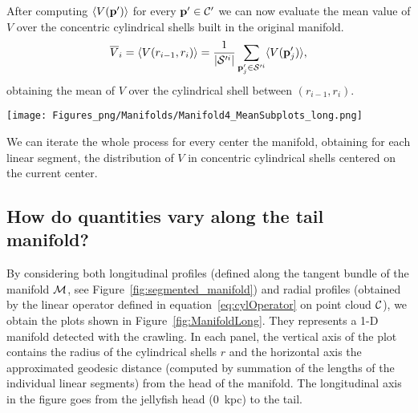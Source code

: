 After computing $\langle V(\boldsymbol{\mathbf{p}}')\rangle$ for every $\boldsymbol{\mathbf{p}}' \in \mathcal{C}'$ we can now evaluate the mean value of $V$ over the concentric cylindrical shells built in the original manifold.%
\begin{equation}
  \overline{V}_{i} = \langle V(r_{i-1},r_i)\rangle = \frac{1}{|\mathcal{S}'^i|} \sum_{\boldsymbol{\mathbf{p}}'_j \in \mathcal{S}'^i} \langle V(\boldsymbol{\mathbf{p}}'_j)\rangle,
\end{equation}
obtaining the mean of $V$ over the cylindrical shell between $(r_{i-1},r_i)$.

\begin{sidewaysfigure}
  \centering
  \texttt{[image: Figures\_png/Manifolds/Manifold4\_MeanSubplots\_long.png]}
  \caption{Longitudinal and radial profiles of different quantities for a long manifold constituting a tentacle of the tail of the jellyfish.
  In the top left corner, the position of the manifold in the diffused dataset is shown in red.
  In the top right corner a detailed view of the non diffused gaseous particle belonging to the manifold.}
  \label{fig:ManifoldLong}
\end{sidewaysfigure}


%

We can iterate the whole process for every center the manifold, obtaining for each linear segment, the distribution of $V$ in concentric cylindrical shells centered on the current center.

\subsection{How do quantities vary along the tail manifold?}
By considering both longitudinal profiles (defined along the tangent bundle of the manifold $\mathcal{M}$, see Figure~\ref{fig:segmented_manifold})
and radial profiles (obtained by the linear operator defined in equation~\eqref{eq:cylOperator} on point cloud $\mathcal{C}$), we obtain the plots shown in Figure~\ref{fig:ManifoldLong}.%
They represents a 1-D manifold detected with the crawling.
In each panel, the vertical axis of the plot contains the radius of the cylindrical shells $r$
and the horizontal axis the approximated geodesic distance (computed by summation of the lengths of the individual linear segments) from the head of the manifold.
The longitudinal axis in the figure goes from the jellyfish head ($0$~kpc) to the tail.

